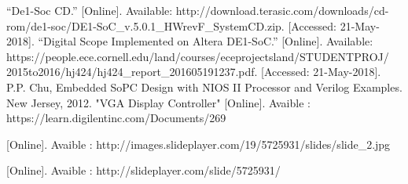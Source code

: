 \documentclass[paper]{IEEEtran}
\begin{document}
\begin{thebibliography}{00}
 “De1-Soc CD.” [Online]. Available: http://download.terasic.com/downloads/cd-rom/de1-soc/DE1-SoC\_v.5.0.1\_HWrevF\_SystemCD.zip. [Accessed: 21-May-2018].
 “Digital Scope Implemented on Altera DE1-SoC.” [Online]. Available: https://people.ece.cornell.edu/land/courses/eceprojectsland/STUDENTPROJ/\\2015to2016/hj424/hj424\_report\_201605191237.pdf. [Accessed: 21-May-2018].
 P.P. Chu, Embedded SoPC Design with NIOS II Processor and Verilog Examples. New Jersey, 2012.
 "VGA Display Controller" [Online]. Avaible : https://learn.digilentinc.com/Documents/269

 [Online]. Avaible : http://images.slideplayer.com/19/5725931/slides/slide\_2.jpg

 [Online]. Avaible : http://slideplayer.com/slide/5725931/
\end{thebibliography}
\end{document}
